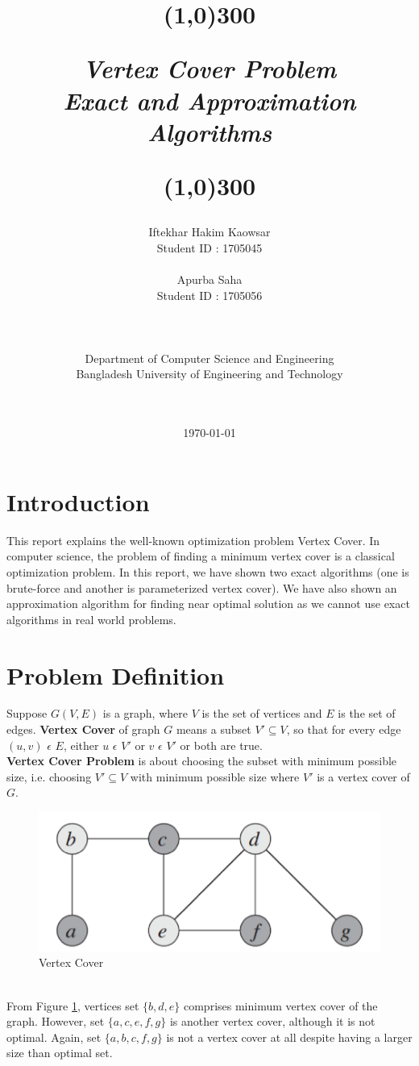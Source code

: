 \documentclass[12pt, a4paper]{article}
\title{
	\line(1,0){300}
	\endgraf\bigskip
	\Huge
	\begin{center}
		\emph{Vertex Cover Problem} \\
		\emph{\Large{Exact and Approximation Algorithms}}
		
	\end{center}
	\line(1,0){300}
	\bigskip
	\bigskip
}
\author{
	\large{Iftekhar Hakim Kaowsar}\\
	\large{Student ID : 1705045}\\\\
	\large{Apurba Saha}\\
	\large{Student ID : 1705056}\\\\\\\\
	\Large{Department of Computer Science and Engineering}\\
	\Large{Bangladesh University of Engineering and Technology}\\\\\\
}
\date{
	\endgraf\bigskip
	\Large{\today}
}
\begin{document}
	\maketitle
	\pagebreak
	\tableofcontents
	\pagebreak
	\section{Introduction}
	This report explains the well-known optimization problem Vertex Cover. In computer science, the problem of finding a minimum vertex cover is a classical optimization problem. In this report, we have shown two exact algorithms (one is brute-force and another is parameterized vertex cover). We have also shown an approximation algorithm for finding near optimal solution as we cannot use exact algorithms in real world problems.
	\section{Problem Definition}
	Suppose $G(V,E)$ is a graph, where $V$ is the set of vertices and $E$ is the set of edges.
	\textbf{Vertex Cover} of graph $G$ means a subset $V'\subseteq V$, so that for every edge $(u,v)$ $\epsilon$ $E$, either $u$ $\epsilon$ $V'$ or $v$ $\epsilon$ $V'$ or both are true. \\
	\textbf{Vertex Cover Problem} is about choosing the subset with minimum possible size, i.e. choosing $V'\subseteq V$ with minimum possible size where $V'$ is a vertex cover of $G$.
	\begin{figure}[h]
		\centering
		\includegraphics[scale=0.5]{intro_vc.PNG}
		\caption{\label{fig:intro_vc}Vertex Cover}
	\end{figure} \\
	From Figure \ref{fig:intro_vc}, vertices set $\{b, d, e\}$ comprises minimum vertex cover of the graph. However, set $\{a, c, e, f, g\}$ is another vertex cover, although it is not optimal. Again, set $\{a, b, c, f, g\}$ is not a vertex cover at all despite having a larger size than optimal set.
\end{document}
